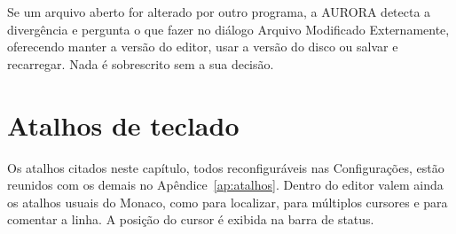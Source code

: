 Se um arquivo aberto for alterado por outro programa, a AURORA detecta a divergência e pergunta o que fazer no diálogo Arquivo Modificado Externamente, oferecendo manter a versão do editor, usar a versão do disco ou salvar e recarregar. Nada é sobrescrito sem a sua decisão.

\section{Atalhos de teclado}

Os atalhos citados neste capítulo, todos reconfiguráveis nas Configurações, estão reunidos com os demais no Apêndice~\ref{ap:atalhos}. Dentro do editor valem ainda os atalhos usuais do Monaco, como  para localizar,  para múltiplos cursores e  para comentar a linha. A posição do cursor é exibida na barra de status.
